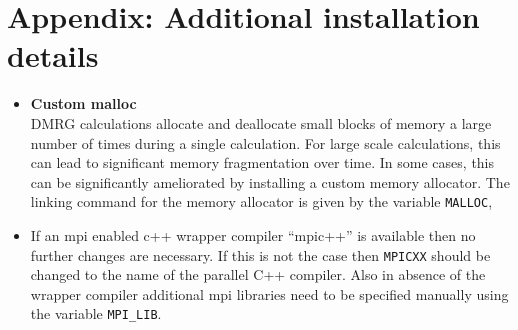 \documentclass[letterpaper,12pt,aps, pra]{revtex4-1}
\begin{document}
\section{Appendix: Additional installation details}\label{sec:appInstall}
\begin{itemize}
	\item \textbf{Custom malloc}\\
DMRG calculations allocate and deallocate small blocks of memory a large number of times during a single calculation. For large scale calculations,
this can lead to significant memory fragmentation over time. In some cases, this can be significantly ameliorated by installing a
custom memory allocator. The linking command for the memory allocator is given by the variable \texttt{MALLOC},
	\item 
If an mpi enabled c++ wrapper compiler ``mpic++'' is available then no further changes are necessary. If this is not the case then \texttt{MPICXX} should be changed to the name of the parallel C++ compiler.  Also in absence of the wrapper compiler additional mpi libraries need to be specified manually using the variable \texttt{MPI\_LIB}. %
\end{itemize}
\end{document}

